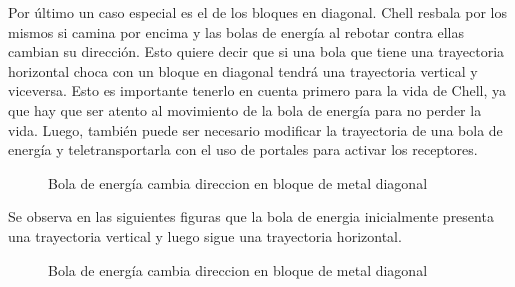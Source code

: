 \documentclass[a4paper]{article}
\begin{document}
\newpage

Por último un caso especial es el de los bloques en diagonal. Chell resbala por los mismos si camina por encima y las bolas de energía al rebotar contra ellas cambian su dirección. Esto quiere decir que si una bola que tiene una trayectoria horizontal choca con un bloque en diagonal tendrá una trayectoria vertical y viceversa. Esto es importante tenerlo en cuenta primero para la vida de Chell, ya que hay que ser atento al movimiento de la bola de energía para no perder la vida. Luego, también puede ser necesario modificar la trayectoria de una bola de energía y teletransportarla con el uso de portales para activar los receptores.

\begin{figure}[!h]
	\caption{Bola de energía cambia direccion en bloque de metal diagonal}
	\label{fig:diagrama12}
\end{figure}

Se observa en las siguientes figuras que la bola de energia inicialmente presenta una trayectoria vertical y luego sigue una trayectoria horizontal.

\begin{figure}[!h]
	\caption{Bola de energía cambia direccion en bloque de metal diagonal}
	\label{fig:diagrama13}
\end{figure}
\end{document}
